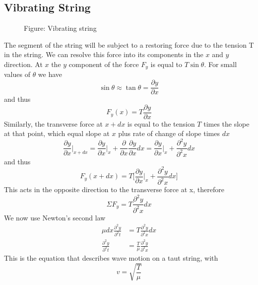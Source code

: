 \documentclass[../../../main.tex]{subfiles}
\begin{document}
\subsection*{Vibrating String}
\begin{figure*}[t]
    \centering
    \caption*{Figure: Vibrating string}
\end{figure*}
The segment of the string will be subject to a restoring force due to the tension T in the string. We can resolve this force into its components in the $x$ and $y$ direction. At $x$ the $y$ component of the force $F_y$ is equal to $T \sin \theta$. For small values of $\theta$ we have
\begin{equation*}
    \sin \theta \approx \tan \theta=\frac{\partial y}{\partial x}
\end{equation*}
and thus 
\begin{equation*}
    F_y(x)= T \frac{\partial y}{\partial x}
\end{equation*}
Similarly, the transverse force at $x + dx$ is equal to the tension $T$ times the slope at that point, which equal slope at $x$ plus rate of change of slope times $dx$
\begin{equation*}
    \frac{\partial y}{\partial x}\bigg |_{x + dx} =\frac{\partial y}{\partial x}\bigg |_{x}+ \frac{\partial }{\partial x} \frac{\partial y}{\partial x} dx= \frac{\partial y}{\partial x}\bigg |_{x}+ \frac{\partial^2 y}{\partial^2 x} dx
\end{equation*}
and thus 
\begin{equation*}
    F_y(x+dx)= T \biggl[\frac{\partial y}{\partial x}\bigg |_{x}+ \frac{\partial^2 y}{\partial^2 x} dx\biggr]
\end{equation*}
This acts in the opposite direction to the transverse force at x, therefore
\begin{equation*}
    \Sigma F_y=T  \frac{\partial^2 y}{\partial^2 x} dx
\end{equation*}
We now use Newton's second law 
\begin{align*}
    \mu dx \frac{\partial^2 y}{\partial^2 t}&= T  \frac{\partial^2 y}{\partial^2 x} dx\\
    \frac{\partial^2 y}{\partial^2 t}&=\frac{T}{\mu} \frac{\partial^2 y}{\partial^2 x}
\end{align*}
This is the equation that describes wave motion on a taut string, with
\begin{equation*}
    v=\sqrt{\frac{T}{\mu}}
\end{equation*}
\end{document}
